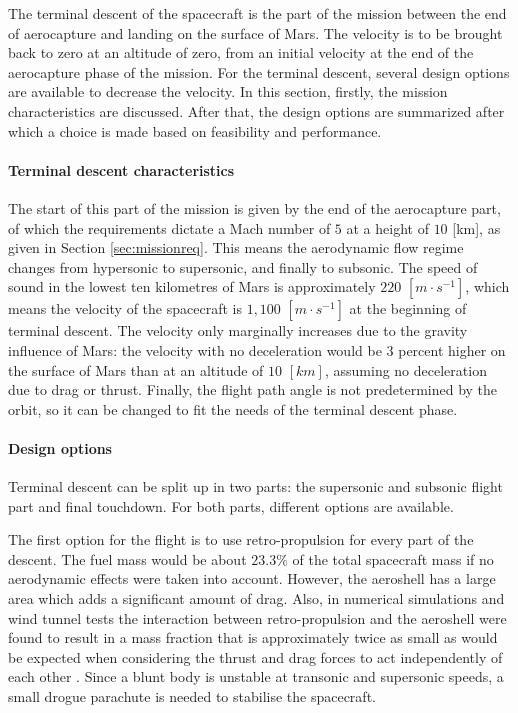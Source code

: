 The terminal descent of the spacecraft is the part of the mission between the end of aerocapture and landing on the surface of Mars. The velocity is to be brought back to zero at an altitude of zero, from an initial velocity at the end of the aerocapture phase of the mission. For the terminal descent, several design options are available to decrease the velocity. In this section, firstly, the mission characteristics are discussed. After that, the design options are summarized after which a choice is made based on feasibility and performance.

\paragraph{Terminal descent characteristics}
The start of this part of the mission is given by the end of the aerocapture part, of which the requirements dictate a Mach number of $5$ at a height of $10$ [km], as given in Section \ref{sec:missionreq}. This means the aerodynamic flow regime changes from hypersonic to supersonic, and finally to subsonic. The speed of sound in the lowest ten kilometres of Mars is approximately $220$ $[m\cdot s^{-1}]$, which means the velocity of the spacecraft is $1,100$ $[m\cdot s^{-1}]$ at the beginning of terminal descent. The velocity only marginally increases due to the gravity influence of Mars: the velocity with no deceleration would be 3 percent higher on the surface of Mars than at an altitude of $10$ $[km]$, assuming no deceleration due to drag or thrust. Finally, the flight path angle is not predetermined by the orbit, so it can be changed to fit the needs of the terminal descent phase.

\paragraph{Design options}
Terminal descent can be split up in two parts: the supersonic and subsonic flight part and final touchdown. For both parts, different options are available.

The first option for the flight is to use retro-propulsion for every part of the descent. The fuel mass would be about $23.3\%$ of the total spacecraft mass if no aerodynamic effects were taken into account. However, the aeroshell has a large area which adds a significant amount of drag. Also, in numerical simulations and wind tunnel tests the interaction between retro-propulsion and the aeroshell were found to result in a mass fraction that is approximately twice as small as would be expected when considering the thrust and drag forces to act independently of each other \cite{Korzun2009}. Since a blunt body is unstable at transonic and supersonic speeds, a small drogue parachute is needed to stabilise the spacecraft.

